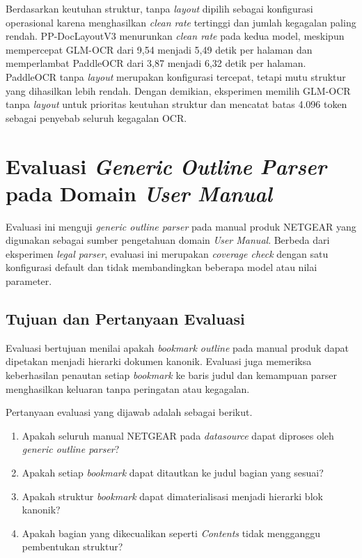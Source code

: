Berdasarkan keutuhan struktur,  tanpa \textit{layout} dipilih sebagai konfigurasi operasional karena menghasilkan \textit{clean rate} tertinggi dan jumlah kegagalan paling rendah.
PP-DocLayoutV3 menurunkan \textit{clean rate} pada kedua model, meskipun mempercepat GLM-OCR dari 9,54 menjadi 5,49 detik per halaman dan memperlambat PaddleOCR dari 3,87 menjadi 6,32 detik per halaman.
PaddleOCR tanpa \textit{layout} merupakan konfigurasi tercepat, tetapi mutu struktur yang dihasilkan lebih rendah.
Dengan demikian, eksperimen memilih GLM-OCR tanpa \textit{layout} untuk prioritas keutuhan struktur dan mencatat batas 4.096 token sebagai penyebab seluruh kegagalan OCR.

\section{Evaluasi \textit{Generic Outline Parser} pada Domain \textit{User Manual}}
\label{sec:evaluasi-generic-outline-customer-service}

Evaluasi ini menguji \textit{generic outline parser} pada manual produk NETGEAR yang digunakan sebagai sumber pengetahuan domain \textit{User Manual}.
Berbeda dari eksperimen \textit{legal parser}, evaluasi ini merupakan \textit{coverage check} dengan satu konfigurasi default dan tidak membandingkan beberapa model atau nilai parameter.

\subsection{Tujuan dan Pertanyaan Evaluasi}
\label{sec:tujuan-evaluasi-generic-outline}

Evaluasi bertujuan menilai apakah \textit{bookmark outline} pada manual produk dapat dipetakan menjadi hierarki dokumen kanonik.
Evaluasi juga memeriksa keberhasilan penautan setiap \textit{bookmark} ke baris judul dan kemampuan parser menghasilkan keluaran tanpa peringatan atau kegagalan.

Pertanyaan evaluasi yang dijawab adalah sebagai berikut.

\begin{enumerate}
  \item Apakah seluruh manual NETGEAR pada \textit{datasource} dapat diproses oleh \textit{generic outline parser}?
  \item Apakah setiap \textit{bookmark} dapat ditautkan ke judul bagian yang sesuai?
  \item Apakah struktur \textit{bookmark} dapat dimaterialisasi menjadi hierarki blok kanonik?
  \item Apakah bagian yang dikecualikan seperti \textit{Contents} tidak mengganggu pembentukan struktur?
\end{enumerate}

